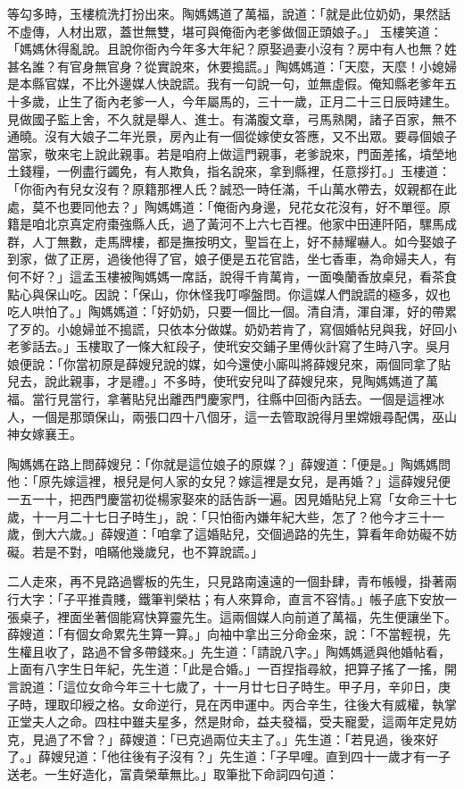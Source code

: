 \begin{showcontents}{}
等勾多時，玉樓梳洗打扮出來。陶媽媽道了萬福，說道：「就是此位奶奶，果然話不虛傳，人材出眾，蓋世無雙，堪可與俺衙內老爹做個正頭娘子。」
玉樓笑道： 「媽媽休得亂說。且說你衙內今年多大年紀？原娶過妻小沒有？房中有人也無？姓甚名誰？有官身無官身？從實說來，休要搗謊。」陶媽媽道：「天麼，天麼！小媳婦是本縣官媒，不比外邊媒人快說謊。我有一句說一句，並無虛假。俺知縣老爹年五十多歲，止生了衙內老爹一人，今年屬馬的，三十一歲，正月二十三日辰時建生。見做國子監上舍，不久就是舉人、進士。有滿腹文章，弓馬熟閑，諸子百家，無不通曉。沒有大娘子二年光景，房內止有一個從嫁使女答應，又不出眾。要尋個娘子當家，敬來宅上說此親事。若是咱府上做這門親事，老爹說來，門面差搖，墳塋地土錢糧，一例盡行蠲免，有人欺負，指名說來，拿到縣裡，任意拶打。」玉樓道：「你衙內有兒女沒有？原籍那裡人氏？誠恐一時任滿，千山萬水帶去，奴親都在此處，莫不也要同他去？」陶媽媽道：「俺衙內身邊，兒花女花沒有，好不單徑。原籍是咱北京真定府棗強縣人氏，過了黃河不上六七百裡。他家中田連阡陌，騾馬成群，人丁無數，走馬牌樓，都是撫按明文，聖旨在上，好不赫耀嚇人。如今娶娘子到家，做了正房，過後他得了官，娘子便是五花官誥，坐七香車，為命婦夫人，有何不好？」這孟玉樓被陶媽媽一席話，說得千肯萬肯，一面喚蘭香放桌兒，看茶食點心與保山吃。因說：「保山，你休怪我叮嚀盤問。你這媒人們說謊的極多，奴也吃人哄怕了。」陶媽媽道：「好奶奶，只要一個比一個。清自清，渾自渾，好的帶累了歹的。小媳婦並不搗謊，只依本分做媒。奶奶若肯了，寫個婚帖兒與我，好回小老爹話去。」玉樓取了一條大紅段子，使玳安交鋪子里傅伙計寫了生時八字。吳月娘便說：「你當初原是薛嫂兒說的媒，如今還使小廝叫將薛嫂兒來，兩個同拿了貼兒去，說此親事，才是禮。」不多時，使玳安兒叫了薛嫂兒來，見陶媽媽道了萬福。當行見當行，拿著貼兒出離西門慶家門，往縣中回衙內話去。一個是這裡冰人，一個是那頭保山，兩張口四十八個牙，這一去管取說得月里嫦娥尋配偶，巫山神女嫁襄王。

陶媽媽在路上問薛嫂兒：「你就是這位娘子的原媒？」薛嫂道：「便是。」陶媽媽問他：「原先嫁這裡，根兒是何人家的女兒？嫁這裡是女兒，是再婚？」這薛嫂兒便一五一十，把西門慶當初從楊家娶來的話告訴一遍。因見婚貼兒上寫「女命三十七歲，十一月二十七日子時生」，說：「只怕衙內嫌年紀大些，怎了？他今才三十一歲，倒大六歲。」薛嫂道：「咱拿了這婚貼兒，交個過路的先生，算看年命妨礙不妨礙。若是不對，咱瞞他幾歲兒，也不算說謊。」

二人走來，再不見路過響板的先生，只見路南遠遠的一個卦肆，青布帳幔，掛著兩行大字：「子平推貴賤，鐵筆判榮枯；有人來算命，直言不容情。」帳子底下安放一張桌子，裡面坐著個能寫快算靈先生。這兩個媒人向前道了萬福，先生便讓坐下。薛嫂道：「有個女命累先生算一算。」向袖中拿出三分命金來，說：「不當輕視，先生權且收了，路過不曾多帶錢來。」先生道：「請說八字。」陶媽媽遞與他婚帖看，上面有八字生日年紀，先生道：「此是合婚。」一百捏指尋紋，把算子搖了一搖，開言說道：「這位女命今年三十七歲了，十一月廿七日子時生。甲子月，辛卯日，庚子時，理取印綬之格。女命逆行，見在丙申運中。丙合辛生，往後大有威權，執掌正堂夫人之命。四柱中雖夫星多，然是財命，益夫發福，受夫寵愛，這兩年定見妨克，見過了不曾？」薛嫂道：「已克過兩位夫主了。」先生道：「若見過，後來好了。」薛嫂兒道：「他往後有子沒有？」先生道：「子早哩。直到四十一歲才有一子送老。一生好造化，富貴榮華無比。」取筆批下命詞四句道：


\end{showcontents}
